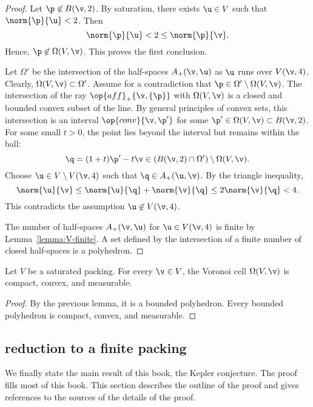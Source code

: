 \begin{cnl}
\begin{proof}
Let $\p\not\in \openBall{\v}{2}$.  
By saturation, there exists $\u\in V$ such that $\norm{\p}{\u}<2$.
Then 
\[  
\norm{\p}{\u} < 2 \le \norm{\p}{\v}.
\] 
Hence, $\p\not\in\Omega(V,\v)$.  This proves the first conclusion.


Let $\Omega'$ be the intersection of the half-spaces $\Aplus(\v,\u)$ as
$\u$ runs over $\Vee{V}(\v,4)$.  Clearly, $\Omega(V,\v)\subset \Omega'$.
Assume for a contradiction that $\p\in \Omega'\setminus\Omega(V,\v)$.
The intersection of the ray $\op{aff}_+\braced{\v,\{\p\}}$ with
$\Omega(V,\v)$ is a closed and bounded convex subset of the line.  By
general principles of convex sets, this intersection is an interval
$\op{conv}\braced{\v,\p'}$ for some $\p'\in\Omega(V,\v)\subset \openBall{\v}{2}$.
For some small $t>0$, the point lies beyond the interval but remains
within the ball:
\[  
\q = (1+t)\p' -t \v\in (\openBall{\v}{2}\cap \Omega')\setminus \Omega(V,\v).
\] 
Choose $\u\in V\setminus \Vee{V}(\v,4)$ such that $\q\in \Aplus(\u,\v)$.  By the
triangle inequality,
\[  
\norm{\u}{\v} \le \norm{\u}{\q} + \norm{\v}{\q} \le 2\norm{\v}{\q} < 4.
\] 
This contradicts the assumption $\u\not\in \Vee{V}(\v,4)$.

The number of half-spaces $\Aplus(\v,\u)$ for $\u\in \Vee{V}(\v,4)$ is finite by
Lemma~\ref{lemma:V-finite}.  A set defined by the intersection of a finite number
of closed half-spaces is a polyhedron.
\end{proof}

\begin{lemma}
\label{lemma:Voronoi-compact}
Let $ V$ be a saturated packing.  For every $\v\in  V$, 
the Voronoi cell $\Omega( V,\v)$  is
compact, convex, and measurable.
\end{lemma}

\begin{proof} By the previous lemma, it is a bounded polyhedron.
  Every bounded polyhedron is compact, convex, and measurable.
\end{proof}




\subsection{reduction to a finite packing}\label{reduction to finite}

We finally state the main result of this book, the Kepler conjecture.
The proof fills most of this book. This section describes the
outline of the proof and gives references to the sources of the
details of the proof.



\end{cnl}
